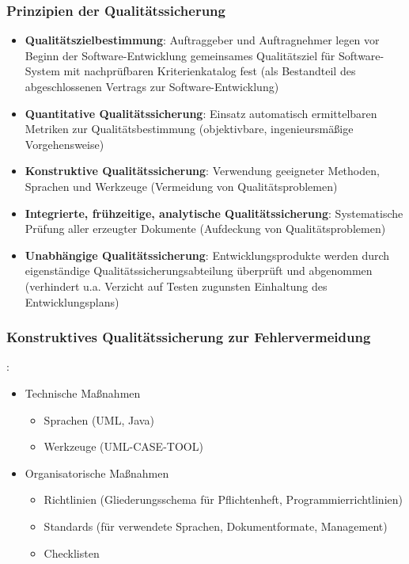 	\subsubsection{Prinzipien der Qualitätssicherung}
	\begin{itemize}
		\item \textbf{Qualitätszielbestimmung}: Auftraggeber und Auftragnehmer legen vor Beginn der Software-Entwicklung gemeinsames Qualitätsziel für Software-System mit nachprüfbaren Kriterienkatalog fest (als Bestandteil des abgeschlossenen Vertrags zur Software-Entwicklung)
		\item \textbf{Quantitative Qualitätssicherung}: Einsatz automatisch ermittelbaren Metriken zur Qualitätsbestimmung (objektivbare, ingenieursmäßige Vorgehensweise)
		\item \textbf{Konstruktive Qualitätssicherung}: Verwendung geeigneter Methoden, Sprachen und Werkzeuge (Vermeidung von Qualitätsproblemen)
		\item \textbf{Integrierte, frühzeitige, analytische Qualitätssicherung}: Systematische Prüfung aller erzeugter Dokumente (Aufdeckung von Qualitätsproblemen)
		\item \textbf{Unabhängige Qualitätssicherung}: Entwicklungsprodukte werden durch eigenständige Qualitätssicherungsabteilung überprüft und abgenommen (verhindert u.a. Verzicht auf Testen zugunsten Einhaltung des Entwicklungsplans)
	\end{itemize}
	\subsubsection{Konstruktives Qualitätssicherung zur Fehlervermeidung}: 
	\begin{itemize}
		\item Technische Maßnahmen
		\begin{itemize}
			\item Sprachen (UML, Java)
			\item Werkzeuge (UML-CASE-TOOL)
		\end{itemize}
		\item Organisatorische Maßnahmen
		\begin{itemize}
			\item Richtlinien (Gliederungsschema für Pflichtenheft, Programmierrichtlinien)
			\item Standards (für verwendete Sprachen, Dokumentformate, Management)
			\item Checklisten
		\end{itemize}
	\end{itemize}
